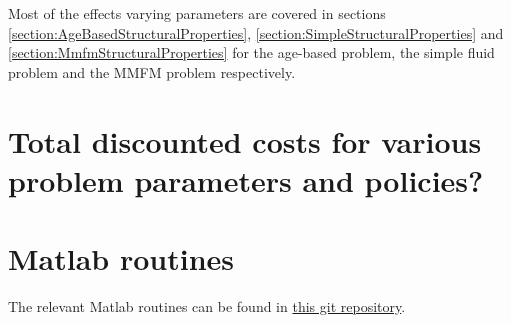 Most of the effects varying parameters are covered in sections \ref{section:AgeBasedStructuralProperties}, \ref{section:SimpleStructuralProperties} and \ref{section:MmfmStructuralProperties} for the age-based problem, the simple fluid problem and the MMFM problem respectively.




\begin{appendices}
	
	
\chapter{Total discounted costs for various problem parameters and policies?}\label{AppendixComputationsTable}

\chapter{Matlab routines}
The relevant Matlab routines can be found in
\href{https://github.com/MartijnGosgens/preventive-maintenance.git}{this git repository}.
\end{appendices}
